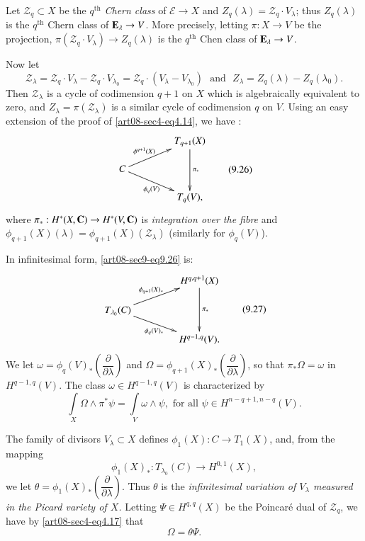 Let $\mathscr{Z}_{q}\subset X$ be the $q^{\text{th}}$ {\em Chern class} of $\mathcal{E}\to X$ and $Z_{q}(\lambda)=\mathscr{Z}_{q}\cdot V_{\lambda}$; thus $Z_{q}(\lambda)$ is the $q^{\text{th}}$ Chern class of $\mathbf{E}_{\lambda}\to V$. More precisely, letting $\pi:X\to V$ be the projection, $\pi(\mathscr{Z}_{q}\cdot V_{\lambda})\to Z_{q}(\lambda)$ is the $q^{\text{th}}$ Chen class of $\mathbf{E}_{\lambda}\to V$.

Now let
$$
\mathscr{Z}_{\lambda}=\mathscr{Z}_{q}\cdot V_{\lambda}-\mathscr{Z}_{q}\cdot V_{\lambda_{0}}=\mathscr{Z}_{q}\cdot (V_{\lambda}-V_{\lambda_{0}})\text{~ and~ } Z_{\lambda}=Z_{q}(\lambda)-Z_{q}(\lambda_{0}).
$$
Then $\mathscr{Z}_{\lambda}$ is a cycle of codimension $q+1$ on $X$ which is algebraically equivalent to zero, and $Z_{\lambda}=\pi(\mathscr{Z}_{\lambda})$ is a similar cycle of codimension $q$ on $V$. Using an easy extension of the proof of \eqref{art08-sec4-eq4.14}, we have :
\begin{equation*}
\vcenter{\xymatrix@C=1.5cm@R=.5cm{
 & T_{q+1}(X)\ar[dd]^-{\pi_{*}}\\
C\ar[ur]^-{\phi^{q+1}(X)}\ar[dr]_{\phi_{q}(V)} & \\
 & T_{q}(V),
}}\tag{9.26}\label{art08-sec9-eq9.26}
\end{equation*}
where $\pi_{*}:H^{*}(X,\mathbf{C})\to H^{*}(V,\mathbf{C})$ is {\em integration over the fibre} and $\phi_{q+1}(X)(\lambda)=\phi_{q+1}(X)(\mathscr{Z}_{\lambda})$ (similarly for $\phi_{q}(V)$).

In infinitesimal form, \eqref{art08-sec9-eq9.26} is:
\begin{equation*}
\vcenter{\xymatrix@C=1.5cm@R=.5cm{
 & H^{q,q+1}(X)\ar[dd]^-{\pi_{*}}\\
T_{\lambda_{0}}(C)\ar[ur]^-{\phi_{q+1}(X)_{*}}\ar[dr]_{\phi_{q}(V)_{*}} & \\
 & H^{q-1,q}(V).
}}\tag{9.27}\label{art08-sec9-eq9.27}
\end{equation*}\pageoriginale
We let $\omega=\phi_{q}(V)_{*}\left(\dfrac{\partial}{\partial\lambda}\right)$ and $\Omega=\phi_{q+1}(X)_{*}\left(\dfrac{\partial}{\partial\lambda}\right)$, so that $\pi_{*}\Omega=\omega$ in $H^{q-1,q}(V)$. The class $\omega\in H^{q-1,q}(V)$ is characterized by
\begin{equation*}
\int\limits_{X}\Omega\wedge\pi^{*}\psi=\int\limits_{V}\omega\wedge\psi,\text{ for all } \psi\in H^{n-q+1,n-q}(V).\tag{9.28}\label{art08-sec9-eq9.28}
\end{equation*}

The family of divisors $V_{\lambda}\subset X$ defines $\phi_{1}(X):C\to T_{1}(X)$, and, from the mapping
\begin{equation*}
\phi_{1}(X)_{*}:T_{\lambda_{0}}(C)\to H^{0,1}(X),\tag{9.29}\label{art08-sec9-eq9.29}
\end{equation*}
we let $\theta=\phi_{1}(X)_{*}\left(\dfrac{\partial}{\partial\lambda}\right)$. Thus $\theta$ is the {\em infinitesimal variation of $V_{\lambda}$ measured in the Picard variety of $X$.} Letting $\Psi\in H^{q,q}(X)$ be the Poincar\'e dual of $\mathscr{Z}_{q}$, we have by \eqref{art08-sec4-eq4.17} that
\begin{equation*}
\Omega=\theta\Psi.\tag{9.30}\label{art08-sec9-eq9.30}
\end{equation*}


